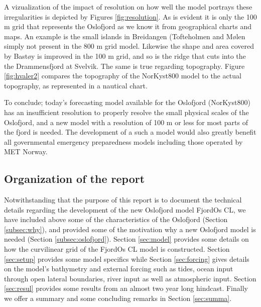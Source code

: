 A vizualization of the impact of resolution on how well the model portrays these irregularities is depicted by Figures \ref{fig:resolution}. As is evident it is only the 100 m grid that represents the Oslofjord as we know it from geographical charts and maps. An example is the small islands in Breidangen (Tofteholmen and M{\o}len simply not present in the 800 m grid model. Likewise the shape and area covered by Bast{\o}y is improved in the 100 m grid, and so is the ridge that cuts into the the Drammensfjord at Svelvik. The same is true regarding topography. Figure \ref{fig:hvaler2} compares the topography of the NorKyst800 model to the actual topography, as represented in a nautical chart. 

To conclude; today's forecasting model available for the Oslofjord (NorKyst800) has an insufficient resolution to properly resolve the small physical scales of the Oslofjord, and a new model with a resolution of 100 m or less for most parts of the fjord is needed. The development of a such a model would also greatly benefit all governmental emergency preparedness models including those operated by MET Norway.   


\subsection{Organization of the report}
Notwithstanding that the purpose of this report is to document the technical details regarding the development of the new Oslofjord model FjordOs CL, we have included above some of the characteristics of the Oslofjord (Section \ref{subsec:why}), and provided some of the motivation why a new Oslofjord model is needed (Section \ref{subsec:oslofjord}). Section \ref{sec:model} provides some details on how the curvilinear grid of the FjordOs CL model is constructed. Section \ref{sec:setup} provides some model specifics while Section \ref{sec:forcing} gives details on the model's bathymetry and external forcing such as tides, ocean input through open lateral boundaries, river input as well as atmospheric input. Section \ref{sec:resul} provides some results from an almost two year long hindcast. Finally we offer a summary and some concluding remarks in Section \ref{sec:summa}. 

